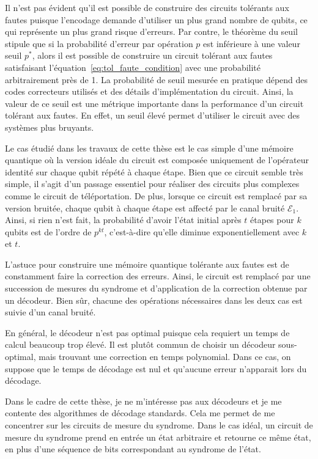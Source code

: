 Il n'est pas évident qu'il est possible de construire des circuits tolérants aux fautes
puisque l'encodage demande d'utiliser un plus grand nombre de qubits,
ce qui représente un plus grand risque d'erreurs.
Par contre,
le théorème du seuil~\cite{aharonov_fault-tolerant_1999} stipule que si la probabilité d'erreur
par opération $p$ est inférieure à une valeur seuil $p^*$,
alors il est possible de construire un circuit tolérant aux fautes satisfaisant
l'équation~\ref{eq:tol_faute_condition} avec une probabilité arbitrairement près de 1.
La probabilité de seuil mesurée en pratique dépend des codes correcteurs utilisés
et des détails d'implémentation du circuit.
Ainsi,
la valeur de ce seuil est une métrique importante dans la performance d'un circuit tolérant aux fautes.
En effet,
un seuil élevé permet d'utiliser le circuit avec des systèmes plus bruyants.

Le cas étudié dans les travaux de cette thèse est le cas simple d'une mémoire quantique 
où la version idéale du circuit est composée uniquement de l'opérateur identité sur chaque qubit répété à chaque étape.
Bien que ce circuit semble très simple,
il s'agit d'un passage essentiel pour réaliser des circuits plus complexes comme le circuit
de téléportation.
De plus,
lorsque ce circuit est remplacé par sa version bruitée,
chaque qubit à chaque étape est affecté par le canal bruité $\mathcal E_1$.
Ainsi,
si rien n'est fait,
la probabilité d'avoir l'état initial après $t$ étapes pour $k$ qubits est de l'ordre de $p^{kt}$,
c'est-à-dire qu'elle diminue exponentiellement avec $k$ et $t$.

L'astuce pour construire une mémoire quantique tolérante aux fautes
est de constamment faire la correction des erreurs.
Ainsi,
le circuit est remplacé par une succession de mesures du syndrome
et d'application de la correction obtenue par un décodeur.
Bien sûr, 
chacune des opérations nécessaires dans les deux cas est suivie d'un canal bruité.

En général,
le décodeur n'est pas optimal puisque cela requiert un temps de calcul beaucoup trop élevé.
Il est plutôt commun de choisir un décodeur sous-optimal,
mais trouvant une correction en temps polynomial.
Dans ce cas,
on suppose que le temps de décodage est nul 
et qu'aucune erreur n'apparait lors du décodage.

Dans le cadre de cette thèse,
je ne m'intéresse pas aux décodeurs et je me contente des algorithmes de décodage standards.
Cela me permet de me concentrer sur les circuits de mesure du syndrome.
Dans le cas idéal,
un circuit de mesure du syndrome prend en entrée un état arbitraire et retourne ce même état,
en plus d'une séquence de bits correspondant au syndrome de l'état.

